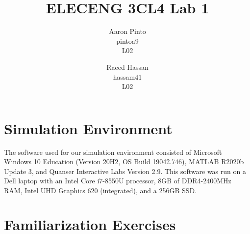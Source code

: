 \documentclass[12pt]{article}
\title{ELECENG 3CL4 Lab 1}
\author{
    Aaron Pinto \\
    pintoa9 \\
    L02
    \and
    Raeed Hassan \\
    hassam41 \\
    L02
}
\begin{document}
\maketitle
\clearpage

\section*{Simulation Environment}
The software used for our simulation environment consisted of Microsoft Windows 10 Education (Version 20H2, OS Build 19042.746), MATLAB R2020b Update 3, and Quanser Interactive Labs Version 2.9. This software was run on a Dell laptop with an Intel Core i7-8550U processor, 8GB of DDR4-2400MHz RAM, Intel UHD Graphics 620 (integrated), and a 256GB SSD.

\section*{Familiarization Exercises} %
\end{document}
